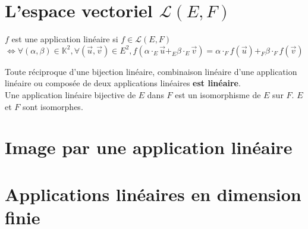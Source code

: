 \section{L'espace vectoriel $\mathcal{L}(E, F)$}\label{sec:l'espace-vectoriel-$mathcal{l}(e-f)$}
  
  $f$ est une application linéaire si $f \in \mathcal{L}(E, F)$\\
  $\iff \forall (\alpha, \beta) \in \mathbb{K}^2, \forall (\vec u, \vec v) \in E^2, f(\alpha \cdot_E \vec u +_E  \beta \cdot_E \vec v) = \alpha \cdot_F f(\vec u) +_F \beta \cdot_F f(\vec v)$

  Toute réciproque d'une bijection linéaire, combinaison linéaire d'une application linéaire ou composée de deux applications linéaires \textbf{est linéaire}.\\
  Une application linéaire bijective de $E$ dans $F$ est un isomorphisme de $E$ sur $F$.
  $E$ et $F$ sont isomorphes.

\section{Image par une application linéaire}\label{sec:image-par-une-application-lineaire}


\section{Applications linéaires en dimension finie}\label{sec:applications-lineaires-en-dimension-finie}
